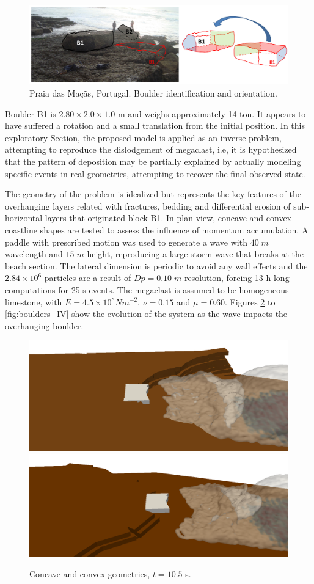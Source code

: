 %
\begin{figure}[ht!]
	\centering
	\includegraphics[width=0.85\linewidth]{Figures/6.Chapter/boulders_exp} 
	\caption{Praia das Ma\c{c}\~{a}s, Portugal. Boulder identification and orientation. \cite{Oliveira-2011}}
	\label{fig:boulders_exp} 
\end{figure}
%

Boulder B1 is $2.80\times2.0\times1.0$ m and weighs approximately 14 ton. It appears to have suffered a rotation and a small translation from the initial position. In this exploratory Section, the proposed model is applied as an inverse-problem, attempting to reproduce the dislodgement of megaclast, i.e, it is hypothesized that the pattern of deposition may be partially explained by actually modeling specific events in real geometries, attempting to recover the final observed state. 

The geometry of the problem is idealized but represents the key features of the overhanging layers related with fractures, bedding and differential erosion of sub-horizontal layers that originated block B1. In plan view, concave and convex coastline shapes are tested to assess the influence of momentum accumulation. A paddle with prescribed motion was used to generate a wave with $40\;m$ wavelength and $15\;m$ height, reproducing a large storm wave that breaks at the beach section. The lateral dimension is periodic to avoid any wall effects and the $2.84\times10^6$ particles are a result of $Dp=0.10\;m$ resolution, forcing 13 h long computations for 25 s events. The megaclast is assumed to be homogeneous limestone, with $E=4.5\times10^8 Nm^{-2}$, $\nu=0.15$ and $\mu=0.60$. Figures \ref{fig:boulders_I} to \ref{fig:boulders_IV} show the evolution of the system as the wave impacts the overhanging boulder.

%
\begin{figure}[ht!]
	\centering
	\includegraphics[width=0.42\linewidth]{Figures/6.Chapter/concave_105} 
	\includegraphics[width=0.42\linewidth]{Figures/6.Chapter/convex_105}
	\caption{Concave and convex geometries, $t=10.5$ s.}
	\label{fig:boulders_I} 
\end{figure}
%

